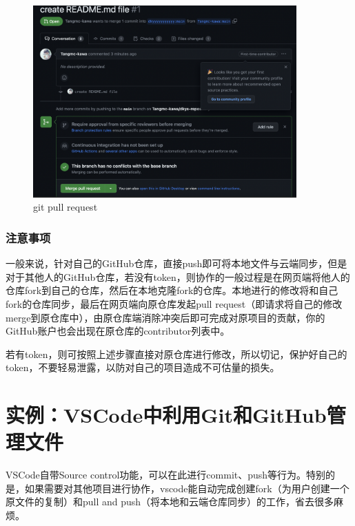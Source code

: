 \begin{enumerate}
\begin{figure}[ht]
\begin{minipage}[c]{0.6\textwidth}
                  \centering
                  \includegraphics[width=0.9\textwidth]{image/git/github-pullrequest2.jpg}
              \end{minipage}
              \caption{git pull request}
              \label{pull-request}
          \end{figure}

\end{enumerate}

\subsubsection{注意事项}
一般来说，针对自己的GitHub仓库，直接push即可将本地文件与云端同步，但是对于其他人的GitHub仓库，若没有token，则协作的一般过程是在网页端将他人的仓库fork到自己的仓库，然后在本地克隆fork的仓库。本地进行的修改将和自己fork的仓库同步，最后在网页端向原仓库发起pull request（即请求将自己的修改merge到原仓库中），由原仓库端消除冲突后即可完成对原项目的贡献，你的GitHub账户也会出现在原仓库的contributor列表中。

若有token，则可按照上述步骤直接对原仓库进行修改，所以切记，保护好自己的token，不要轻易泄露，以防对自己的项目造成不可估量的损失。


\section{实例：VSCode中利用Git和GitHub管理文件}
VSCode自带Source control功能，可以在此进行commit、push等行为。特别的是，如果需要对其他项目进行协作，vscode能自动完成创建fork（为用户创建一个原文件的复制）和pull and push（将本地和云端仓库同步）的工作，省去很多麻烦。

